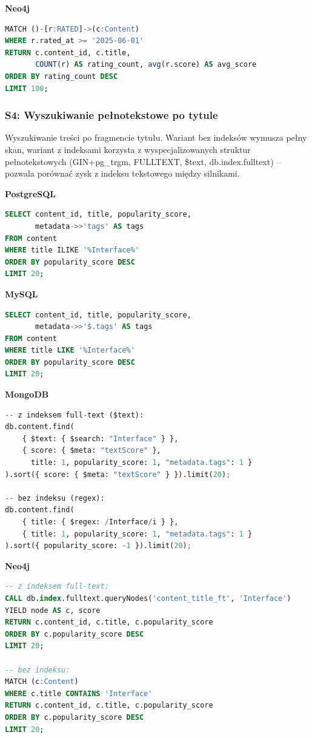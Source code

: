 \textbf{Neo4j}
\begin{lstlisting}[language=SQL]
MATCH ()-[r:RATED]->(c:Content)
WHERE r.rated_at >= '2025-06-01'
RETURN c.content_id, c.title,
       COUNT(r) AS rating_count, avg(r.score) AS avg_score
ORDER BY rating_count DESC
LIMIT 100;
\end{lstlisting}


\subsubsection{S4: Wyszukiwanie pełnotekstowe po tytule}

Wyszukiwanie treści po fragmencie tytułu. Wariant bez indeksów wymusza pełny
skan, wariant z indeksami korzysta z wyspecjalizowanych struktur pełnotekstowych
(GIN+pg\_trgm, FULLTEXT, \$text, db.index.fulltext) -- pozwala porównać zysk
z indeksu tekstowego między silnikami.

\textbf{PostgreSQL}
\begin{lstlisting}[language=SQL]
SELECT content_id, title, popularity_score,
       metadata->>'tags' AS tags
FROM content
WHERE title ILIKE '%Interface%'
ORDER BY popularity_score DESC
LIMIT 20;
\end{lstlisting}

\textbf{MySQL}
\begin{lstlisting}[language=SQL]
SELECT content_id, title, popularity_score,
       metadata->>'$.tags' AS tags
FROM content
WHERE title LIKE '%Interface%'
ORDER BY popularity_score DESC
LIMIT 20;
\end{lstlisting}

\textbf{MongoDB}
\begin{lstlisting}[language=Python]
-- z indeksem full-text ($text):
db.content.find(
    { $text: { $search: "Interface" } },
    { score: { $meta: "textScore" },
      title: 1, popularity_score: 1, "metadata.tags": 1 }
).sort({ score: { $meta: "textScore" } }).limit(20);

-- bez indeksu (regex):
db.content.find(
    { title: { $regex: /Interface/i } },
    { title: 1, popularity_score: 1, "metadata.tags": 1 }
).sort({ popularity_score: -1 }).limit(20);
\end{lstlisting}

\textbf{Neo4j}
\begin{lstlisting}[language=SQL]
-- z indeksem full-text:
CALL db.index.fulltext.queryNodes('content_title_ft', 'Interface')
YIELD node AS c, score
RETURN c.content_id, c.title, c.popularity_score
ORDER BY c.popularity_score DESC
LIMIT 20;

-- bez indeksu:
MATCH (c:Content)
WHERE c.title CONTAINS 'Interface'
RETURN c.content_id, c.title, c.popularity_score
ORDER BY c.popularity_score DESC
LIMIT 20;
\end{lstlisting}


